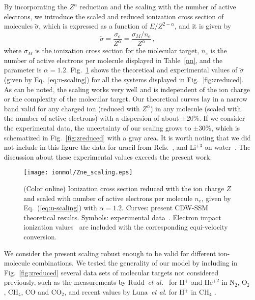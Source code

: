 By incorporating the $Z^\alpha$ reduction and the scaling with the 
number of active electrons, we introduce the scaled and reduced 
ionization cross section of molecules $\tilde{\sigma}$, which is 
expressed as a function of $E/Z^{2-\alpha}$, and it is given by
\begin{equation}
 \tilde{\sigma}=\frac{\sigma_e}{Z^{\alpha}}=\frac{\sigma_M/n_e}{Z^{\alpha}}\,,
\label{eq:u-scaling}
\end{equation}
where $\sigma_M$ is the ionization cross section for the molecular 
target, $n_e$ is the number of active electrons per molecule displayed 
in Table~\ref{nn}, and the parameter is $\alpha=1.2$. 
Fig.~\ref{fig:zalpha} shows the theoretical and experimental values of 
$\tilde{\sigma}$ (given by Eq.~\ref{eq:u-scaling}) for all the systems 
displayed in Fig.~\ref{fig:zreduced}. As can be noted, the scaling 
works very well and is independent of the ion charge or the complexity 
of the molecular target. Our theoretical curves lay in a narrow band 
valid for any charged ion (reduced with $Z^\alpha$) in any molecule 
(scaled with the number of active electrons) with a dispersion of about 
$\pm 20\%$. If we consider the experimental data, the uncertainty of 
our scaling grows to $\pm 30\%$, which is schematized in 
Fig.~\ref{fig:zreduced} with a gray area. It is worth noting that we 
did not include in this figure the data for uracil from 
Refs.~\cite{agnihotri2012,agnihotri2013}, and Li$^{+3}$ on 
water~\cite{Luna_Li_water}. The discussion about these experimental 
values exceeds the present work. 

\begin{figure}
\centering
\texttt{[image: ionmol/Zne\_scaling.eps]}
\caption{(Color online) Ionization cross section reduced with the ion
charge $Z$ and scaled with number of active electrons per molecule $n_e$,
given by Eq.~(\ref{eq:u-scaling}) with $\alpha=1.2$. 
Curves: present CDW-SSM theoretical results. 
Symbols: experimental data~\cite{itoh2013,iriki2011,wolff2014,wang2016,
tribedi2019,Luna2007,Rudd86,pRudd85,toburen80,Ohsawa05,Bhattacharjee17,
DalCappello2009,Tribedi_O_water,Rudd85,Luna2019,Rudd1983}. Electron 
impact ionization values~\cite{rahman2016,bug2017,wolf2019,fuss2009} 
are included with the corresponding equi-velocity conversion.}
\label{fig:zalpha}
\end{figure} 

We consider the present scaling robust enough to be valid for different 
ion-molecule combinations. We tested the generality of our model 
by including in Fig.~\ref{fig:zreduced} several data sets of 
molecular targets not considered previously, such as the measurements 
by Rudd~\textit{et al.}~\cite{Rudd85,Rudd1983} for H$^{+}$ and He$^{+2}$ 
in N$_2$, O$_2$, CH$_4$, CO and CO$_2$, and recent values by 
Luna~\textit{et al.} \cite{Luna2019} for H$^{+}$ in CH$_4$ . 

